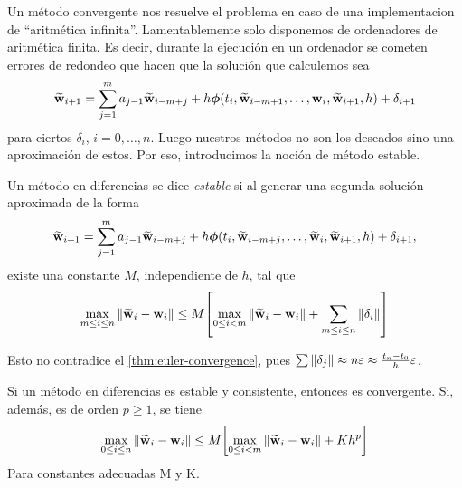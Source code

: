 Un método convergente nos resuelve el problema en caso de una
implementacion de ``aritmética infinita''.
Lamentablemente solo disponemos de ordenadores de aritmética finita.
Es decir, durante la ejecución en un ordenador se cometen errores de redondeo
que hacen que la solución que calculemos sea
\begin{equation*}
    \vb{\widetilde{w}}{}_{i+1} = \sum_{j=1}^m {a_{j-1}\vb{\widetilde{w}}{}_{i-m+j}}
        + h\vb*{\phi}{}(t_i,\vb{\widetilde{w}}{}_{i-m+1}, \dots, \vb{w}{}_i,\vb{\widetilde{w}}{}_{i+1},h) + \delta_{i+1}
\end{equation*}
para ciertos $\delta_i$, $i = 0,\ldots,n$.
Luego nuestros métodos no son los deseados sino una aproximación de estos.
Por eso, introducimos la noción de método estable.

\begin{definition}
    Un método en diferencias se dice \emph{estable}
    si al generar una segunda solución aproximada de la forma
    \begin{equation*}
        \vb{\widetilde{w}}{}_{i+1} = \sum_{j=1}^m {a_{j-1}\vb{\widetilde{w}}{}_{i-m+j}}
            + h \vb*{\phi}{}(t_i,\vb{\widetilde{w}}{}_{i-m+j}, \dots, \vb{\widetilde{w}}{}_i,\vb{\widetilde{w}}{}_{i+1},h)
            + \delta_{i+1},
    \end{equation*}
    existe una constante $M$, independiente de $h$, tal que
    \begin{equation*} \label{stab}
        \max_{m \le i \le n}{\norm{\vb{\widetilde{w}}{}_i - \vb{w}{}_i}} \le M\qty[
            \max_{0 \le i < m}{\norm{\vb{\widetilde{w}}{}_i - \vb{w}{}_i}}
            + \sum_{m \le i \le n} \norm{\delta_i}
        ]
    \end{equation*}
\end{definition}

\begin{remark}
    Esto no contradice el \cref{thm:euler-convergence}, pues
    $\sum\norm{\delta_j} \approx n\varepsilon \approx
    \frac{t_n - t_0}{h}\varepsilon$.
\end{remark}

\begin{theorem}
    Si un método en diferencias es estable y consistente,
    entonces es convergente.
    Si, además, es de orden $p \geq 1$, se tiene
    \begin{equation*}
        \max_{0 \le i \le n}\norm{\vb{\widetilde{w}}{}_i - \vb{w}{}_i} \le M\qty\bigg[
            \max_{0 \le i < m} \norm{\vb{\widetilde{w}}{}_i - \vb{w}{}_i} + Kh^p
            ]
    \end{equation*}
    Para constantes adecuadas M y K.
\end{theorem}


